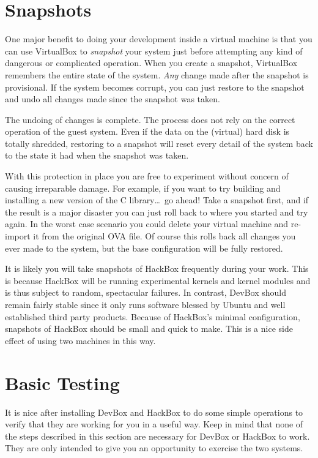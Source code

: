 \documentclass{article}
\begin{document}
\section{Snapshots}
\label{sec:snapsots}

One major benefit to doing your development inside a virtual machine is that you can use
VirtualBox to \emph{snapshot} your system just before attempting any kind of dangerous or
complicated operation. When you create a snapshot, VirtualBox remembers the entire state of the
system. \emph{Any} change made after the snapshot is provisional. If the system becomes corrupt,
you can just restore to the snapshot and undo all changes made since the snapshot was taken.

The undoing of changes is complete. The process does not rely on the correct operation of the
guest system. Even if the data on the (virtual) hard disk is totally shredded, restoring to a
snapshot will reset every detail of the system back to the state it had when the snapshot was
taken.

With this protection in place you are free to experiment without concern of causing irreparable
damage. For example, if you want to try building and installing a new version of the C
library\ldots\ go ahead! Take a snapshot first, and if the result is a major disaster you can
just roll back to where you started and try again. In the worst case scenario you could delete
your virtual machine and re-import it from the original OVA file. Of course this rolls back all
changes you ever made to the system, but the base configuration will be fully restored.

It is likely you will take snapshots of HackBox frequently during your work. This is because
HackBox will be running experimental kernels and kernel modules and is thus subject to random,
spectacular failures. In contrast, DevBox should remain fairly stable since it only runs
software blessed by Ubuntu and well established third party products. Because of HackBox's
minimal configuration, snapshots of HackBox should be small and quick to make. This is a nice
side effect of using two machines in this way.

\section{Basic Testing}

It is nice after installing DevBox and HackBox to do some simple operations to verify that they
are working for you in a useful way. Keep in mind that none of the steps described in this
section are necessary for DevBox or HackBox to work. They are only intended to give you an
opportunity to exercise the two systems.
\end{document}
